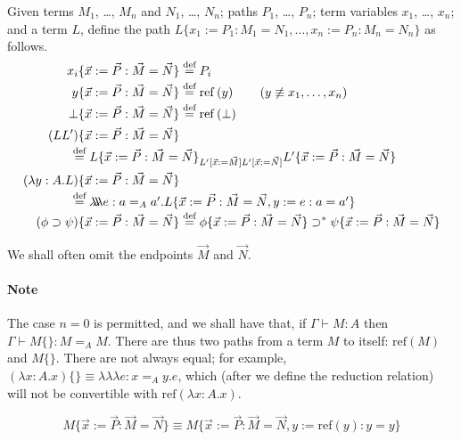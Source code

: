 \documentclass[a4paper,UKenglish]{lipics-v2016}
\newcommand*{\eqdef}{\mathrel{\smash{\stackrel{\text{def}}{=}}}}
\newcommand*{\reff}[1]{\ensuremath{\mathrm{ref} \left( {#1} \right)}}
\newcommand*{\triplelambda}{\ensuremath{\lambda \!\! \lambda \!\! \lambda}}
\theoremstyle{plain}
\begin{document}
\begin{definition}
Given terms $M_1$, \ldots, $M_n$ and $N_1$, \ldots, $N_n$; paths $P_1$, \ldots, $P_n$; term variables $x_1$, \ldots, $x_n$; and a term $L$, define the path $L \{ x_1 := P_1 : M_1 = N_1 , \ldots, x_n := P_n : M_n = N_n \}$ as follows.
\begin{align*}
x_i \{ \vec{x} := \vec{P} : \vec{M} = \vec{N} \} & \eqdef P_i \\
y \{ \vec{x} := \vec{P} : \vec{M} = \vec{N} \} & \eqdef \reff{y} \qquad (y \not\equiv x_1, \ldots, x_n) \\
\bot \{ \vec{x} := \vec{P} : \vec{M} = \vec{N} \} & \eqdef \reff{\bot} \\
(LL') \{ \vec{x} := \vec{P} : \vec{M} = \vec{N} \} \\
\omit\rlap{\qquad \qquad $\eqdef L \{ \vec{x} := \vec{P} : \vec{M} = \vec{N} \}_{L' [\vec{x} := \vec{M}] L' [\vec{x} := \vec{N}]} L' \{ \vec{x} := \vec{P} : \vec{M} = \vec{N} \}$} \\
(\lambda y:A.L) \{ \vec{x} := \vec{P} : \vec{M} = \vec{N} \} & \\
\omit\rlap{\qquad\qquad $\eqdef \triplelambda e : a =_A a' . L \{ \vec{x} := \vec{P} : \vec{M} = \vec{N} , y := e : a = a' \}$} \\
(\phi \supset \psi) \{ \vec{x} := \vec{P} : \vec{M} = \vec{N} \} & \eqdef \phi \{ \vec{x} := \vec{P} : \vec{M} = \vec{N} \} \supset^* \psi \{ \vec{x} := \vec{P} : \vec{M} = \vec{N} \}
\end{align*}
\end{definition}

We shall often omit the endpoints $\vec{M}$ and $\vec{N}$.

\paragraph*{Note}
The case $n = 0$ is permitted, and we shall have that, if $\Gamma \vdash M : A$ then $\Gamma \vdash M \{\} : M =_A M$.  There are thus two paths from a term $M$ to itself: $\reff{M}$ and $M \{\}$.  There are not always equal; for example, $(\lambda x:A.x) \{\} \equiv \triplelambda e : x =_A y. e$, which (after we define the reduction relation) will not be convertible with $\reff{\lambda x:A.x}$.

\begin{lemma}
\[ M \{ \vec{x} := \vec{P} : \vec{M} = \vec{N} \} \equiv M \{ \vec{x} := \vec{P} : \vec{M} = \vec{N}, y := \reff{y} : y = y \} \]
\end{lemma}
\end{document}
